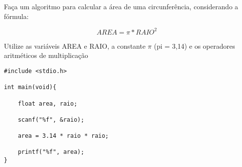
\question[10]

Faça um algoritmo para calcular a área de uma circunferência, considerando a fórmula:

\begin{equation}
	AREA = \pi * RAIO^2
\end{equation}

Utilize as variáveis AREA e RAIO, a constante $\pi$ (pi = 3,14) e os operadores aritméticos de multiplicação

\begin{solution}
\begin{lstlisting}
#include <stdio.h>

int main(void){

	float area, raio;
	
	scanf("%f", &raio);
	
	area = 3.14 * raio * raio;
	
	printf("%f", area);
}
\end{lstlisting}
\end{solution}

